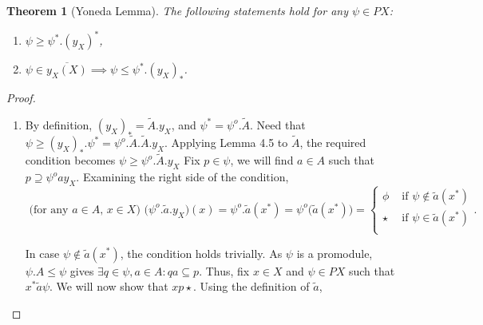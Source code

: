 \documentclass[a4paper]{article}
\newtheorem{theorem}{Theorem}[section]
\theoremstyle{definition}
\begin{document}
\begin{theorem}[Yoneda Lemma] %
	The following statements hold for any $\psi \in PX$:
	\begin{enumerate}[label=(\alph*)]
		\item $\psi \geq \psi^*.(y_X)^*$,
		\item $\psi \in \overline{y_X(X)} \implies \psi \leq \psi^*.(y_X)_*$.
	\end{enumerate}
\end{theorem}
\begin{proof}\setcounter{equation}{0}
	\begin{enumerate}[label=(\alph*)]
		\item By definition, $(y_X)_*=\tilde{A}.y_X$, and $\psi^*=\psi^o.\tilde{A}$. Need that
			$\psi \geq (y_X)_*.\psi^* = \psi^o.\tilde{A}.\tilde{A}.y_X$.
			Applying Lemma 4.5 to
			$\tilde{A}$, the required condition becomes $\psi \geq \psi^o .\tilde{A} .y_X$
			Fix $p \in \psi$,
			we will find $a \in A$ such that $p \supseteq \psi^o a y_X$. Examining the right side of the condition,
			\begin{equation}
				\text{ (for any $a \in A$, $x \in X$) } \Big(\psi^o.\tilde{a} .y_X \Big) (x) = \psi^o.\tilde{a} (x^*)=
				\psi^o\big(\tilde{a}(x^*)\big)= \begin{cases}
					\phi &\text{ if } \psi \notin \tilde{a} (x^*) \\
					\star &\text{ if } \psi \in \tilde{a} (x^*) \\

				\end{cases}.\end{equation}

				In case $\psi \notin \tilde{a} (x^*)$, the condition holds trivially. As $\psi$ is a
				promodule, $\psi.A\leq \psi$ gives $\exists q\in \psi, a
				\in A: qa \subseteq p$. Thus, fix $x\in X$ and	$\psi \in PX$ such that
				$x^* \tilde{a} \psi $. We will now show that $xp\star$. Using the definition of $\tilde{a}$,


\end{enumerate}
\end{proof}
\end{document}
